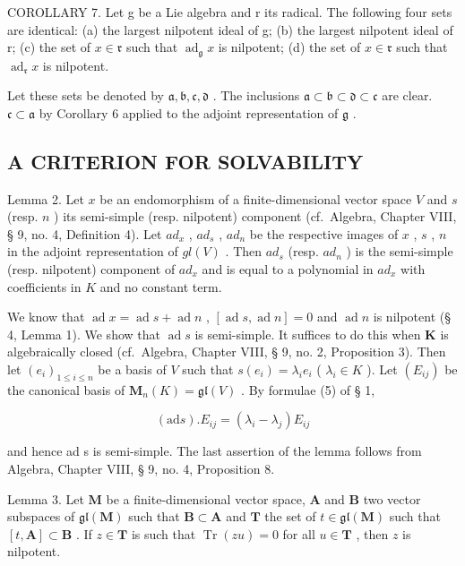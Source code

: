 COROLLARY 7. Let g be a Lie algebra and r its radical. The following four sets are identical: (a) the largest nilpotent ideal of g; (b) the largest nilpotent ideal of r; (c) the set of \(x \in \mathfrak{r}\) such that \(\operatorname{ad}_{\mathfrak{g}} x\) is nilpotent; (d) the set of \(x \in \mathfrak{r}\) such that \(\operatorname{ad}_{\mathfrak{r}} x\) is nilpotent.

Let these sets be denoted by \(\mathfrak{a}, \mathfrak{b}, \mathfrak{c}, \mathfrak{d}\) . The inclusions \(\mathfrak{a} \subset \mathfrak{b} \subset \mathfrak{d} \subset \mathfrak{c}\) are clear. \(\mathfrak{c} \subset \mathfrak{a}\) by Corollary 6 applied to the adjoint representation of \(\mathfrak{g}\) .

\subsection{A CRITERION FOR SOLVABILITY}

Lemma 2. Let \(x\) be an endomorphism of a finite-dimensional vector space \(V\) and \(s\) (resp. \(n\) ) its semi-simple (resp. nilpotent) component (cf.~Algebra, Chapter VIII, § 9, no. 4, Definition 4). Let \(ad_x\) , \(ad_s\) , \(ad_n\) be the respective images of \(x\) , \(s\) , \(n\) in the adjoint representation of \(gl(V)\) . Then \(ad_s\) (resp. \(ad_n\) ) is the semi-simple (resp. nilpotent) component of \(ad_x\) and is equal to a polynomial in \(ad_x\) with coefficients in \(K\) and no constant term.

We know that \(\operatorname{ad} x = \operatorname{ad} s + \operatorname{ad} n\) , \([\operatorname{ad} s, \operatorname{ad} n] = 0\) and \(\operatorname{ad} n\) is nilpotent (§ 4, Lemma 1). We show that \(\operatorname{ad} s\) is semi-simple. It suffices to do this when \(\mathbf{K}\) is algebraically closed (cf.~Algebra, Chapter VIII, § 9, no. 2, Proposition 3). Then let \((e_i)_{1 \leq i \leq n}\) be a basis of \(V\) such that \(s(e_i) = \lambda_i e_i\) ( \(\lambda_i \in K\) ). Let \((E_{ij})\) be the canonical basis of \(\mathbf{M}_n(K) = \mathfrak{gl}(V)\) . By formulae (5) of § 1,

\[
(\mathrm{ad} s). E _ {i j} = (\lambda_ {i} - \lambda_ {j}) E _ {i j}
\]

and hence ad s is semi-simple. The last assertion of the lemma follows from Algebra, Chapter VIII, § 9, no. 4, Proposition 8.

Lemma 3. Let \(\mathbf{M}\) be a finite-dimensional vector space, \(\mathbf{A}\) and \(\mathbf{B}\) two vector subspaces of \(\mathfrak{gl}(\mathbf{M})\) such that \(\mathbf{B} \subset \mathbf{A}\) and \(\mathbf{T}\) the set of \(t \in \mathfrak{gl}(\mathbf{M})\) such that \([t, \mathbf{A}] \subset \mathbf{B}\) . If \(z \in \mathbf{T}\) is such that \(\operatorname{Tr}(zu) = 0\) for all \(u \in \mathbf{T}\) , then \(z\) is nilpotent.

